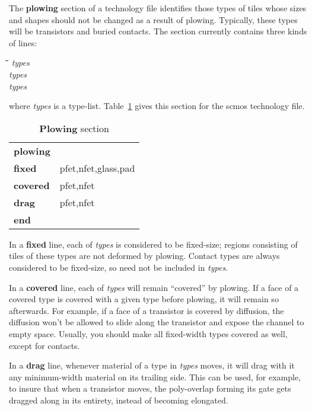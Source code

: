 \documentclass[letterpaper,twoside,12pt]{article}
\def\hinch{\hspace*{0.5in}}
\def\starti{\begin{center}\begin{tabbing}\hinch\=\hinch\=\hinch\=\hinch\=\kill}
\def\endi{\end{tabbing}\end{center}}
\def\ii{\>\>\>}
\begin{document}
The {\bfseries plowing} section of a technology file identifies those types
of tiles whose sizes and shapes should not be changed as a result of plowing.
Typically, these types will be transistors and buried contacts.
The section currently contains three kinds of lines:

\starti
   \ii {\bfseries fixed} {\itshape types} \\
   \ii {\bfseries covered} {\itshape types} \\
   \ii {\bfseries drag} {\itshape types}
\endi

where {\itshape types} is a type-list.
Table~\ref{plowing} gives this section for the scmos technology file.

\begin{table}[ht]
   \begin{center}
      \begin{tabular}{|ll|} \hline
	{\bfseries plowing} & \\
	{\bfseries fixed}   &	pfet,nfet,glass,pad \\
	{\bfseries covered} &	pfet,nfet \\
	{\bfseries drag}    &	pfet,nfet \\
	{\bfseries end}     & \\ \hline
      \end{tabular}
      \caption{{\bfseries Plowing} section}
      \label{plowing}
   \end{center}
\end{table}

In a {\bfseries fixed} line,
each of {\itshape types} is considered to be fixed-size;
regions consisting of tiles of these types are not deformed by plowing.
Contact types are always considered to be fixed-size, so need not
be included in {\itshape types}.

In a {\bfseries covered} line,
each of {\itshape types} will remain ``covered'' by plowing.
If a face of a covered type is covered with a given type
before plowing, it will remain so afterwards.
For example, if a face of a transistor is covered by diffusion,
the diffusion won't be allowed to slide along the transistor
and expose the channel to empty space.
Usually, you should make all fixed-width types covered
as well, except for contacts.

In a {\bfseries drag} line,
whenever material of a type in {\itshape types} moves, it will drag
with it any minimum-width material on its trailing side.  This
can be used, for example, to insure that when a transistor moves,
the poly-overlap forming its gate gets dragged along in its entirety,
instead of becoming elongated.
\end{document}
